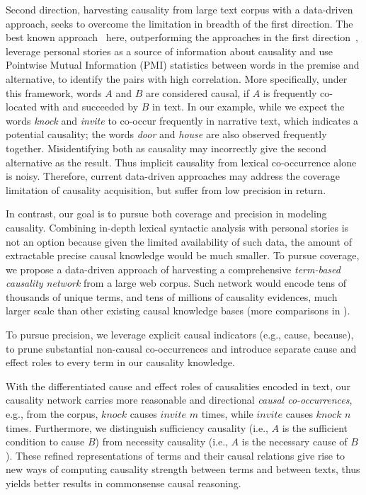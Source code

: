 Second direction, harvesting causality from large
text corpus with a data-driven approach, seeks to overcome
the limitation in breadth of the first direction.
The best known approach~\cite{gordon2011commonsense} here,
outperforming the approaches in the first direction~\cite{gordon2012copa},
leverage personal stories as a source of information about causality and use
Pointwise Mutual Information (PMI) statistics \cite{church1990word}
between words in the premise and alternative, to identify the pairs with
high correlation. More specifically, under this framework,
words $A$ and $B$ are considered causal, if $A$ is frequently co-located
with and succeeded by $B$ in text.
In our example, while we expect the words \emph{knock} and \emph{invite}
to co-occur frequently in narrative text, which indicates a potential causality;
the words \emph{door} and \emph{house} are also observed frequently together.
Misidentifying both as causality may incorrectly give the second
alternative as the result.
Thus implicit causality from lexical co-occurrence alone is noisy.
Therefore, current data-driven approaches may address the coverage
limitation of causality acquisition, but suffer from low precision in return.

In contrast, our goal is to pursue both coverage and precision
in modeling causality. Combining in-depth lexical syntactic analysis with
personal stories is not an option because given the limited availability
of such data,
the amount of extractable precise causal knowledge would be much smaller.
To pursue coverage, we propose a data-driven approach of harvesting
a comprehensive \emph{term-based causality network} from a large web corpus.
Such network would encode tens of thousands of unique terms,
and tens of millions of causality evidences, much larger scale than other
existing causal knowledge bases (more comparisons in ).

To pursue precision, we leverage explicit causal indicators
(e.g., cause, because), to prune substantial non-causal co-occurrences and
introduce separate cause and effect roles to every term in our
causality knowledge.

With the differentiated cause and effect roles of causalities encoded in text,
our causality network carries more reasonable and
directional {\em causal co-occurrences}, e.g., from the corpus,
$knock$ causes $invite$ $m$ times, while $invite$ causes
$knock$ $n$ times. Furthermore, we distinguish sufficiency causality (i.e.,
$A$ is the sufficient condition to cause $B$) from necessity causality
(i.e., $A$ is the necessary cause of $B$).
These refined representations of terms and their causal relations
give rise to new ways of computing causality strength between
terms and between texts,
thus yields better results in commonsense causal reasoning.

